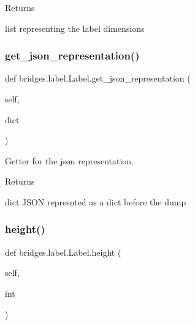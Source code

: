 \begin{DoxyReturn}{Returns}


list representing the label dimensions 
\end{DoxyReturn}
\mbox{\label{classbridges_1_1label_1_1_label_a5075b73938ca71eed43af12f26a71842}} 
\subsubsection{\texorpdfstring{get\+\_\+json\+\_\+representation()}{get\_json\_representation()}}
{\footnotesize\ttfamily def bridges.\+label.\+Label.\+get\+\_\+json\+\_\+representation (\begin{DoxyParamCaption}\item[{}]{self,  }\item[{}]{dict }\end{DoxyParamCaption})}



Getter for the json representation. 

\begin{DoxyReturn}{Returns}


dict J\+S\+ON represnted as a dict before the dump 
\end{DoxyReturn}
\mbox{\label{classbridges_1_1label_1_1_label_a835d7578968142bec34872ad3e757670}} 
\subsubsection{\texorpdfstring{height()}{height()}\hspace{0.1cm}{\footnotesize\ttfamily [1/2]}}
{\footnotesize\ttfamily def bridges.\+label.\+Label.\+height (\begin{DoxyParamCaption}\item[{}]{self,  }\item[{}]{int }\end{DoxyParamCaption})}



